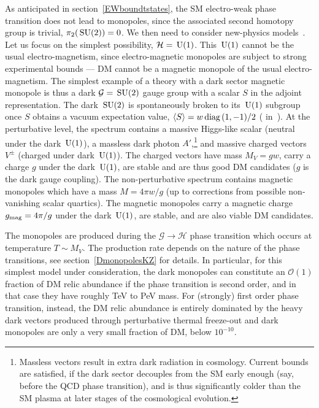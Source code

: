 \medskip

As anticipated in section~\ref{EWboundtstates}, 
the SM electro-weak phase transition does not lead to monopoles, 
since the associated second homotopy group is trivial, $\pi_2(\,{\rm SU}(2))=0$.
We then need to consider new-physics models~\cite{DarkMonopoles}.
Let us focus on the simplest possibility, $\mathcal{H}=\,{\rm U}(1)$. This $\,{\rm U}(1)$ cannot be the usual electro-magnetism, 
since electro-magnetic monopoles  are subject to strong experimental bounds ---
DM cannot be a magnetic monopole of the usual electro-magnetism. 
The simplest example of a theory with a dark sector magnetic monopole is thus 
 a dark $\mathcal{G}=\,{\rm SU}(2)$ gauge group with a scalar $S$ in the adjoint  representation. The dark   $\,{\rm SU}(2)$ is spontaneously broken to its $\,{\rm U}(1)$ subgroup once $S$ obtains a vacuum expectation value, 
$\langle S\rangle =w\,\hbox{diag}\,(1,-1)/2$ ( in~\cite{DarkMonopoles}).
At the perturbative level, the spectrum contains a  massive Higgs-like scalar (neutral under the dark $\,{\rm U}(1)$),
a massless dark photon $A'$,\footnote{Massless vectors result in extra dark radiation in cosmology.
Current bounds are satisfied, if the dark sector decouples from the SM
early enough (say, before the QCD phase transition), 
and is thus  significantly colder than the SM plasma at later stages of the cosmological evolution.}
and massive charged vectors $V^\pm$ (charged under  dark $\,{\rm U}(1)$). 
The charged vectors have mass $M_V =gw$, carry a charge $g$ under the dark $\,{\rm U}(1)$, 
are stable and are thus good DM candidates ($g$ is the dark gauge coupling).
The non-perturbative spectrum contains
magnetic monopoles which have a mass $M =4\pi w/g$ (up to corrections from possible non-vanishing scalar quartics).
The magnetic monopoles carry a magnetic charge $g_{\rm mag}=4\pi/g$ under the dark $\,{\rm U}(1)$, are stable, 
and are also viable DM candidates. 

The monopoles are produced during the
$\mathcal{G}\to \mathcal{H}$ phase transition which occurs at temperature $T \sim M_V$. 
The production rate depends on the nature of the phase transitions,
see section~\ref{DmonopolesKZ} for details. 
In particular, for this simplest model under consideration, the dark monopoles can constitute an ${\mathcal O}(1)$ fraction of DM relic abundance if the phase transition is second order, and in that case they have roughly TeV to PeV mass. 
For (strongly) first order phase transition, instead, the DM relic abundance is entirely dominated by the heavy dark vectors produced through perturbative thermal freeze-out and dark monopoles are only a very small fraction of DM, below $10^{-10}$. 


